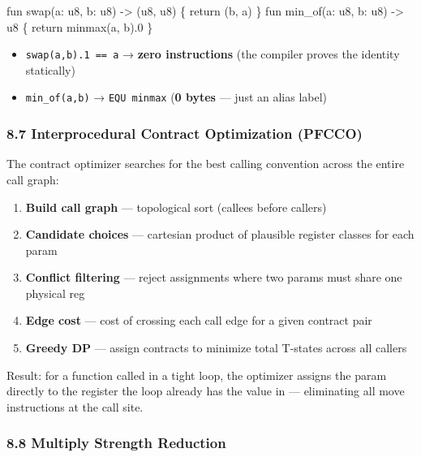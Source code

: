 \documentclass[
  11pt,
]{article}
\newenvironment{Shaded}{\begin{snugshade}}{\end{snugshade}}
\newcommand{\NormalTok}[1]{#1}
\providecommand{\tightlist}{%
  \setlength{\itemsep}{0pt}\setlength{\parskip}{0pt}}
\begin{document}
\begin{Shaded}
\begin{Highlighting}[]
\NormalTok{fun swap(a: u8, b: u8) {-}\textgreater{} (u8, u8) \{ return (b, a) \}}
\NormalTok{fun min\_of(a: u8, b: u8) {-}\textgreater{} u8 \{ return minmax(a, b).0 \}}
\end{Highlighting}
\end{Shaded}

\begin{itemize}
\tightlist
\item
  \texttt{swap(a,b).1\ ==\ a} → \textbf{zero instructions} (the compiler
  proves the identity statically)
\item
  \texttt{min\_of(a,b)} → \texttt{EQU\ minmax} (\textbf{0 bytes} ---
  just an alias label)
\end{itemize}

\hypertarget{interprocedural-contract-optimization-pfcco}{%
\subsubsection{8.7 Interprocedural Contract Optimization
(PFCCO)}\label{interprocedural-contract-optimization-pfcco}}

The contract optimizer searches for the best calling convention across
the entire call graph:

\begin{enumerate}
\def\labelenumi{\arabic{enumi}.}
\tightlist
\item
  \textbf{Build call graph} --- topological sort (callees before
  callers)
\item
  \textbf{Candidate choices} --- cartesian product of plausible register
  classes for each param
\item
  \textbf{Conflict filtering} --- reject assignments where two params
  must share one physical reg
\item
  \textbf{Edge cost} --- cost of crossing each call edge for a given
  contract pair
\item
  \textbf{Greedy DP} --- assign contracts to minimize total T-states
  across all callers
\end{enumerate}

Result: for a function called in a tight loop, the optimizer assigns the
param directly to the register the loop already has the value in ---
eliminating all move instructions at the call site.

\hypertarget{multiply-strength-reduction}{%
\subsubsection{8.8 Multiply Strength
Reduction}\label{multiply-strength-reduction}}
\end{document}

